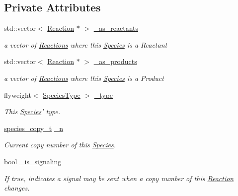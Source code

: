 \subsection*{Private Attributes}
\begin{DoxyCompactItemize}
\item 
std\-::vector$<$ \hyperlink{classReaction}{Reaction} $\ast$ $>$ \hyperlink{group__Chemistry_gaa994e09514c87bde421fd6af1ccc54c0}{\-\_\-as\-\_\-reactants}
\begin{DoxyCompactList}\small\item\em a vector of \hyperlink{classReaction}{Reactions} where this \hyperlink{classSpecies}{Species} is a Reactant \end{DoxyCompactList}\item 
std\-::vector$<$ \hyperlink{classReaction}{Reaction} $\ast$ $>$ \hyperlink{group__Chemistry_ga11b0027a9ca5ac5eb457f2ec64ec28fe}{\-\_\-as\-\_\-products}
\begin{DoxyCompactList}\small\item\em a vector of \hyperlink{classReaction}{Reactions} where this \hyperlink{classSpecies}{Species} is a Product \end{DoxyCompactList}\item 
flyweight$<$ \hyperlink{classSpeciesType}{Species\-Type} $>$ \hyperlink{group__Chemistry_ga77c5f76a330d0ef11a438b87877b910e}{\-\_\-type}
\begin{DoxyCompactList}\small\item\em This \hyperlink{classSpecies}{Species}' type. \end{DoxyCompactList}\item 
\hyperlink{common_8h_a3503f321fd36304ee274141275cca586}{species\-\_\-copy\-\_\-t} \hyperlink{group__Chemistry_gaec9a5cfb6a2f80e122f6369ae404b89d}{\-\_\-n}
\begin{DoxyCompactList}\small\item\em Current copy number of this \hyperlink{classSpecies}{Species}. \end{DoxyCompactList}\item 
bool \hyperlink{group__Chemistry_ga0cc46a3518db8b9e682d1f8544530daf}{\-\_\-is\-\_\-signaling}
\begin{DoxyCompactList}\small\item\em If true, indicates a signal may be sent when a copy number of this \hyperlink{classReaction}{Reaction} changes. \end{DoxyCompactList}\end{DoxyCompactItemize}
